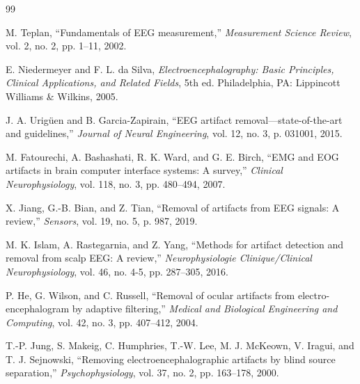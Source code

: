 \documentclass{article}
\begin{document}




\begin{thebibliography}{99}

M. Teplan, ``Fundamentals of EEG measurement,'' \textit{Measurement Science Review}, vol. 2, no. 2, pp. 1--11, 2002.

E. Niedermeyer and F. L. da Silva, \textit{Electroencephalography: Basic Principles, Clinical Applications, and Related Fields}, 5th ed. Philadelphia, PA: Lippincott Williams \& Wilkins, 2005.

J. A. Urig\"{u}en and B. Garcia-Zapirain, ``EEG artifact removal---state-of-the-art and guidelines,'' \textit{Journal of Neural Engineering}, vol. 12, no. 3, p. 031001, 2015.

M. Fatourechi, A. Bashashati, R. K. Ward, and G. E. Birch, ``EMG and EOG artifacts in brain computer interface systems: A survey,'' \textit{Clinical Neurophysiology}, vol. 118, no. 3, pp. 480--494, 2007.

X. Jiang, G.-B. Bian, and Z. Tian, ``Removal of artifacts from EEG signals: A review,'' \textit{Sensors}, vol. 19, no. 5, p. 987, 2019.

M. K. Islam, A. Rastegarnia, and Z. Yang, ``Methods for artifact detection and removal from scalp EEG: A review,'' \textit{Neurophysiologie Clinique/Clinical Neurophysiology}, vol. 46, no. 4-5, pp. 287--305, 2016.

P. He, G. Wilson, and C. Russell, ``Removal of ocular artifacts from electro-encephalogram by adaptive filtering,'' \textit{Medical and Biological Engineering and Computing}, vol. 42, no. 3, pp. 407--412, 2004.

T.-P. Jung, S. Makeig, C. Humphries, T.-W. Lee, M. J. McKeown, V. Iragui, and T. J. Sejnowski, ``Removing electroencephalographic artifacts by blind source separation,'' \textit{Psychophysiology}, vol. 37, no. 2, pp. 163--178, 2000.


\end{thebibliography}
\end{document}

